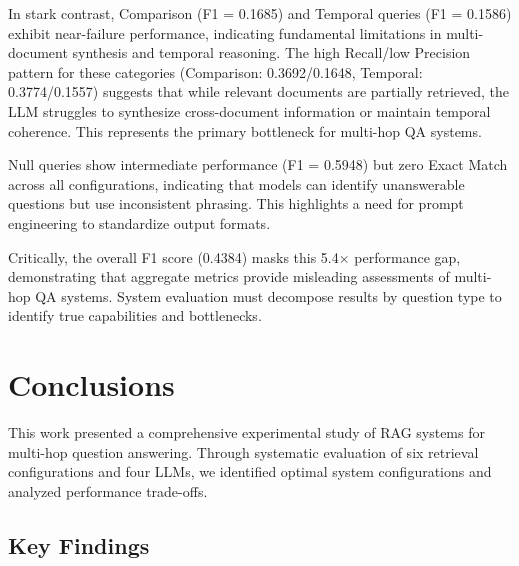 \documentclass[10pt,twocolumn]{article}
\begin{document}
In stark contrast, Comparison (F1 = 0.1685) and Temporal queries (F1 = 0.1586) exhibit near-failure performance, indicating fundamental limitations in multi-document synthesis and temporal reasoning. The high Recall/low Precision pattern for these categories (Comparison: 0.3692/0.1648, Temporal: 0.3774/0.1557) suggests that while relevant documents are partially retrieved, the LLM struggles to synthesize cross-document information or maintain temporal coherence. This represents the primary bottleneck for multi-hop QA systems.

Null queries show intermediate performance (F1 = 0.5948) but zero Exact Match across all configurations, indicating that models can identify unanswerable questions but use inconsistent phrasing. This highlights a need for prompt engineering to standardize output formats.

Critically, the overall F1 score (0.4384) masks this 5.4× performance gap, demonstrating that aggregate metrics provide misleading assessments of multi-hop QA systems. System evaluation must decompose results by question type to identify true capabilities and bottlenecks.

\section{Conclusions}

This work presented a comprehensive experimental study of RAG systems for multi-hop question answering. Through systematic evaluation of six retrieval configurations and four LLMs, we identified optimal system configurations and analyzed performance trade-offs.

\subsection{Key Findings}
\end{document}
